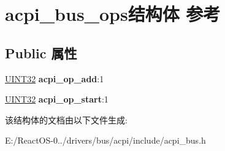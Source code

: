 \hypertarget{structacpi__bus__ops}{}\section{acpi\+\_\+bus\+\_\+ops结构体 参考}
\label{structacpi__bus__ops}
\subsection*{Public 属性}
\begin{DoxyCompactItemize}
\item 
\mbox{\label{structacpi__bus__ops_ab7c38e7c8c088316d1aeae5d2a677580}} 
\hyperlink{_processor_bind_8h_ae1e6edbbc26d6fbc71a90190d0266018}{U\+I\+N\+T32} {\bfseries acpi\+\_\+op\+\_\+add}\+:1
\item 
\mbox{\label{structacpi__bus__ops_a5c69c78c165e73298c66026393dcdea6}} 
\hyperlink{_processor_bind_8h_ae1e6edbbc26d6fbc71a90190d0266018}{U\+I\+N\+T32} {\bfseries acpi\+\_\+op\+\_\+start}\+:1
\end{DoxyCompactItemize}


该结构体的文档由以下文件生成\+:\begin{DoxyCompactItemize}
\item 
E\+:/\+React\+O\+S-\/0../drivers/bus/acpi/include/acpi\+\_\+bus.\+h\end{DoxyCompactItemize}
